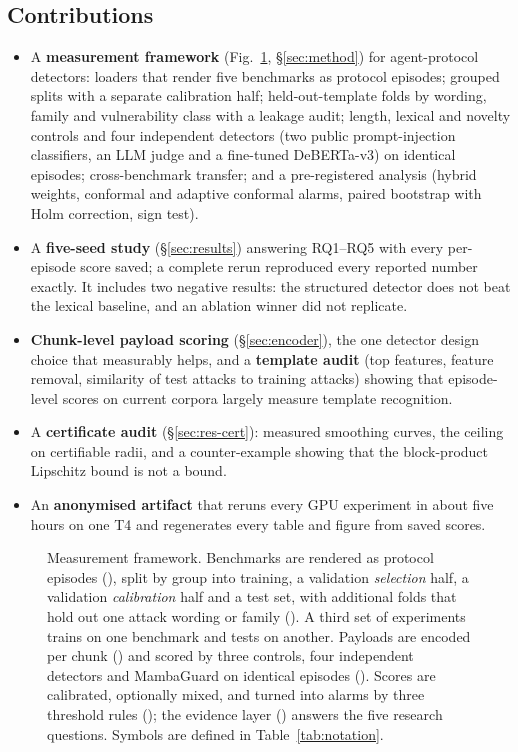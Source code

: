 \documentclass[conference,compsoc]{IEEEtran}
\begin{document}
\subsection{Contributions}
\label{sec:contrib}
\begin{itemize}
  \item A \textbf{measurement framework} (Fig.~\ref{fig:framework}, \S\ref{sec:method}) for agent-protocol detectors: loaders that render five benchmarks as protocol episodes; grouped splits with a separate calibration half; held-out-template folds by wording, family and vulnerability class with a leakage audit; length, lexical and novelty controls and four independent detectors (two public prompt-injection classifiers, an LLM judge and a fine-tuned DeBERTa-v3) on identical episodes; cross-benchmark transfer; and a pre-registered analysis (hybrid weights, conformal and adaptive conformal alarms, paired bootstrap with Holm correction, sign test).
  \item A \textbf{five-seed study} (\S\ref{sec:results}) answering RQ1--RQ5 with every per-episode score saved; a complete rerun reproduced every reported number exactly. It includes two negative results: the structured detector does not beat the lexical baseline, and an ablation winner did not replicate.
  \item \textbf{Chunk-level payload scoring} (\S\ref{sec:encoder}), the one detector design choice that measurably helps, and a \textbf{template audit} (top features, feature removal, similarity of test attacks to training attacks) showing that episode-level scores on current corpora largely measure template recognition.
  \item A \textbf{certificate audit} (\S\ref{sec:res-cert}): measured smoothing curves, the ceiling on certifiable radii, and a counter-example showing that the block-product Lipschitz bound is not a bound.
  \item An \textbf{anonymised artifact} that reruns every GPU experiment in about five hours on one T4 and regenerates every table and figure from saved scores.
\end{itemize}

\begin{figure}[!t]
\centering

\caption{Measurement framework. Benchmarks are rendered as protocol episodes (), split by group into training, a validation \emph{selection} half, a validation \emph{calibration} half and a test set, with additional folds that hold out one attack wording or family (). A third set of experiments trains on one benchmark and tests on another. Payloads are encoded per chunk () and scored by three controls, four independent detectors and MambaGuard on identical episodes (). Scores are calibrated, optionally mixed, and turned into alarms by three threshold rules (); the evidence layer () answers the five research questions. Symbols are defined in Table~\ref{tab:notation}.}
\label{fig:framework}
\end{figure}
\end{document}
